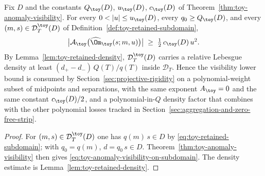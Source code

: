 
\begin{corollary}
\label{cor:toy-visibility-polynomial-weight}
Fix \(D\) and the constants \(Q_\toy(D)\), \(u_\toy(D)\), \(c_\toy(D)\)
of Theorem~\ref{thm:toy-anomaly-visibility}.  For every
\(0<|u|\le u_\toy(D)\), every \(q_0\ge Q_\toy(D)\), and every
\((m,s)\in\mathcal D_T^\toy(D)\) of
Definition~\ref{def:toy-retained-subdomain},
\begin{equation}
\label{eq:toy-anomaly-visibility-on-subdomain}
        \bigl|\mathcal A_\toy\bigl(\widehat\Om_\toy(s;m,u)\bigr)\bigr|
        \;\ge\;\tfrac12\,c_\toy(D)\,u^{2}.
\end{equation}
By Lemma~\ref{lem:toy-retained-density},
\(\mathcal D_T^\toy(D)\) carries a relative Lebesgue density at
least \((d_+-d_-)\,Q(T)/q(T)\) inside \(\mathcal D_T\).  Hence the
visibility lower bound is consumed by
Section~\ref{sec:projective-rigidity} on a polynomial-weight subset
of midpoints and separations, with the same exponent \(A_\toy=0\) and
the same constant \(c_\toy(D)/2\), and a polynomial-in-\(Q\)
density factor that combines with the other polynomial losses tracked
in Section~\ref{sec:aggregation-and-zero-free-strip}.
\end{corollary}

\begin{proof}
For \((m,s)\in\mathcal D_T^\toy(D)\) one has \(q(m)\,s\in D\) by
\eqref{eq:toy-retained-subdomain}; with \(q_0=q(m)\),
\(d=q_0\,s\in D\).  Theorem~\ref{thm:toy-anomaly-visibility} then
gives \eqref{eq:toy-anomaly-visibility-on-subdomain}.  The density
estimate is Lemma~\ref{lem:toy-retained-density}.
\end{proof}


